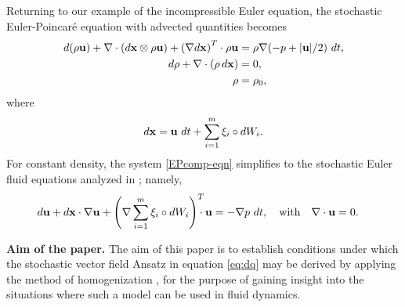 \documentclass[12pt,onesided]{article}
\def\MM#1{{\bf{#1}}}
\newcommand{\difft}{d}
\begin{document}
Returning to our example of the incompressible Euler equation, the 
stochastic Euler-Poincar\'e equation with advected quantities becomes
 \begin{align}
 \begin{split}
 {\difft}(\rho{\MM{u}}) + \nabla\cdot({\difft}\MM{x} \otimes \rho{\MM{u}})%
+ \left(\nabla {\difft}\MM{x}\right)^T \cdot
 \rho{\MM{u}} & = \rho\nabla (-p + |{\MM{u}}|/2)\,{{\,\difft t}}, \\
 {\difft}\rho + \nabla\cdot(\rho\,{\difft}\MM{x}) & = 0, 
\\
 \rho &= \rho_0,
 \end{split}
 \label{EPcomp-eqn}
 \end{align}
where 
\begin{equation}
{\difft}\MM{x} = {\MM{u}}\,{{\,\difft t}} + \sum_{i=1}^m \MM{\xi}_i\circ {\difft W_i}.
\end{equation}
For constant density, the system \eqref{EPcomp-eqn} simplifies to the stochastic Euler fluid equations analyzed in \cite{CrFlHo2017}; namely,
\begin{align}
{\difft}{\MM{u}} 
+ {\difft}\MM{x}\cdot\nabla{\MM{u}} 
+ \left(\nabla \sum_{i=1}^m \MM{\xi}_i\circ {\difft W_i}\right)^T\!\!\!\! \cdot{\MM{u}}
 = -\nabla p\,{{\,\difft t}}
 , \quad\hbox{with}\quad
\nabla\cdot {\MM{u}} & = 0.
\end{align}

\noindent
{\bf Aim of the paper.}
The aim of this paper is to establish conditions under which the stochastic vector field Ansatz in equation \eqref{eq:dq} may be derived by applying the method of homogenization \cite{Givonetal04,PavliotisStuart}, for the purpose of gaining insight into the situations where such a model can be used in fluid dynamics.


\end{document}
